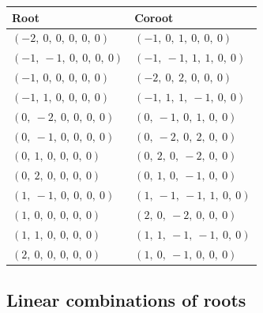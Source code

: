 \documentclass[11pt]{article}
\theoremstyle{definition}
\newif\ifsummablepairs
\begin{document}
\bigskip

\noindent \begin{tabular}{|l|l|}
    \hline
    \textbf{Root} & \textbf{Coroot} \\
    \hline
    $\left( -2, \  0, \  0, \  0, \  0, \  0\right)$ & $\left( -1, \  0, \  1, \  0, \  0, \  0\right)$ \\
    \hline
    $\left( -1, \  -1, \  0, \  0, \  0, \  0\right)$ & $\left( -1, \  -1, \  1, \  1, \  0, \  0\right)$ \\
    \hline
    $\left( -1, \  0, \  0, \  0, \  0, \  0\right)$ & $\left( -2, \  0, \  2, \  0, \  0, \  0\right)$ \\
    \hline
    $\left( -1, \  1, \  0, \  0, \  0, \  0\right)$ & $\left( -1, \  1, \  1, \  -1, \  0, \  0\right)$ \\
    \hline
    $\left( 0, \  -2, \  0, \  0, \  0, \  0\right)$ & $\left( 0, \  -1, \  0, \  1, \  0, \  0\right)$ \\
    \hline
    $\left( 0, \  -1, \  0, \  0, \  0, \  0\right)$ & $\left( 0, \  -2, \  0, \  2, \  0, \  0\right)$ \\
    \hline
    $\left( 0, \  1, \  0, \  0, \  0, \  0\right)$ & $\left( 0, \  2, \  0, \  -2, \  0, \  0\right)$ \\
    \hline
    $\left( 0, \  2, \  0, \  0, \  0, \  0\right)$ & $\left( 0, \  1, \  0, \  -1, \  0, \  0\right)$ \\
    \hline
    $\left( 1, \  -1, \  0, \  0, \  0, \  0\right)$ & $\left( 1, \  -1, \  -1, \  1, \  0, \  0\right)$ \\
    \hline
    $\left( 1, \  0, \  0, \  0, \  0, \  0\right)$ & $\left( 2, \  0, \  -2, \  0, \  0, \  0\right)$ \\
    \hline
    $\left( 1, \  1, \  0, \  0, \  0, \  0\right)$ & $\left( 1, \  1, \  -1, \  -1, \  0, \  0\right)$ \\
    \hline
    $\left( 2, \  0, \  0, \  0, \  0, \  0\right)$ & $\left( 1, \  0, \  -1, \  0, \  0, \  0\right)$ \\
    \hline
\end{tabular}


\ifsummablepairs
\subsection{Linear combinations of roots}
\end{document}
